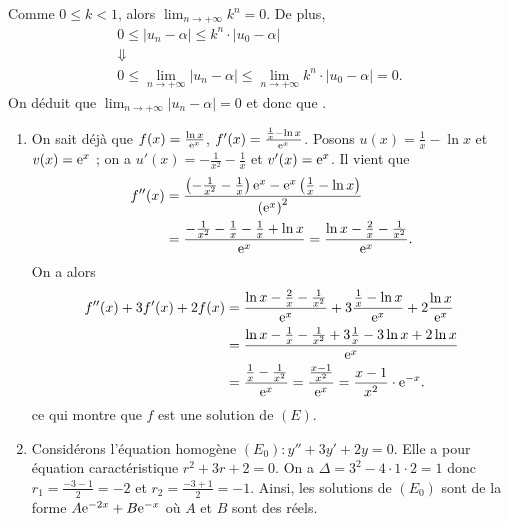 \begin{description}
\begin{enumerate}
\begin{enumerate}
							Comme $0 \leq k < 1$, alors $\displaystyle{\lim_{n\rightarrow+\infty} k^n = 0}$.
							De plus, 
							\[
								\begin{array}{c}
									0 \leq |u_n - \alpha | \leq k^n \cdot |u_0 - \alpha |	\\
									\Downarrow	\\
									0 \leq \displaystyle{ \lim_{n\rightarrow +\infty} |u_n - \alpha | }
										\leq \displaystyle{ \lim_{n\rightarrow +\infty} k^n \cdot |u_0 - \alpha | }
										= 0 .
								\end{array}
							\]
							On d\'eduit que $\displaystyle{\lim_{n\rightarrow +\infty} |u_n - \alpha |}=0$ et donc que
							.
				\end{enumerate}
		\end{enumerate}
	\item[Partie C]
		\begin{enumerate}
			\item {}
				On sait d\'ej\`a que $f(x) = \frac{\ln x}{\mathrm{e}^{x}}$, $f'(x) = \frac{\frac{1}{x} - \ln x}{\mathrm{e}^{x}}$.
				Posons $u(x) = \frac{1}{x} - \ln x$ et $v(x) = \mathrm{e}^{x}$ ;
				on a $u'(x) = -\frac{1}{x^2} - \frac{1}{x}$ et $v'(x) = \mathrm{e}^{x}$.
				Il vient que 
				\begin{align*}
					f''(x) & = 
					\frac{\left( -\frac{1}{x^2} - \frac{1}{x} \right) \mathrm{e}^{x} - \mathrm{e}^{x} \left( \frac{1}{x} - \ln x \right)}
					{\left( \mathrm{e}^{x} \right)^2} \\
							& = \frac{-\frac{1}{x^2} - \frac{1}{x} - \frac{1}{x} + \ln x}{\mathrm{e}^{x}} = 
					\frac{\ln x - \frac{2}{x} - \frac{1}{x^2}}{\mathrm{e}^{x}} .
				\end{align*}
				On a alors 
				\begin{align*}
					f''(x) + 3 f'(x) + 2 f(x)
					& = \frac{\ln x - \frac{2}{x} - \frac{1}{x^2}}{\mathrm{e}^{x}} 
							+ 3 \frac{\frac{1}{x} - \ln x}{\mathrm{e}^{x}} 
							+ 2 \frac{\ln x}{\mathrm{e}^{x}} 																				\\
					& = \frac{\ln x-\frac{1}{x}-\frac{1}{x^2}+3\frac{1}{x}-3\ln x+2\ln x}{\mathrm{e}^{x}}					\\
					& = \frac{\frac{1}{x}-\frac{1}{x^2}}{\mathrm{e}^{x}} 															
					  = \frac{\frac{x-1}{x^2}}{\mathrm{e}^{x}} 																		
					  = \frac{x-1}{x^2} \cdot \mathrm{e}^{-x} .
				\end{align*}
				ce qui montre que $f$ est une solution de $(E)$.
			\item {}
					Consid\'erons l'\'equation homog\`ene $(E_0) : y'' + 3y' + 2y = 0$.
					Elle a pour \'equation caract\'eristique $r^2 + 3 r + 2 = 0$.
				On a $\Delta = 3^2 - 4 \cdot 1 \cdot 2 = 1$ donc 
					$r_1 = \frac{-3-1}{2} = -2$ et $r_2 = \frac{-3+1}{2} = -1$.
				Ainsi, les solutions de $(E_0)$ sont de la forme $ A \mathrm{e}^{-2x} + B \mathrm{e}^{-x}$ o\`u $A$ et $B$ sont des r\'eels.
				

\end{enumerate}
\end{description}

